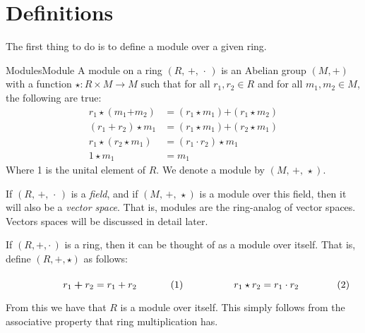 \section{Definitions}
    The first thing to do is to define a module over a given ring.
    \begin{fdefinition}{Modules}{Module}
        A module on a ring $(R,\,+,\,\cdot\,)$ is an
        \gls{Abelian group} $(M,\boldsymbol{+})$ with a function
        $\star:R\times{M}\rightarrow{M}$ such that for all $r_{1},r_{2}\in{R}$
        and for all $m_{1},m_{2}\in{M}$, the following are true:
        \begin{align}
            r_{1}\star(m_{1}\boldsymbol{+}m_{2})
                &=(r_{1}\star{m}_{1})\boldsymbol{+}(r_{1}\star{m}_{2})
                \tag{Scalar Distributivity}\\
            (r_{1}+r_{2})\star{m}_{1}
                &=(r_{1}\star{m}_{1})\boldsymbol{+}(r_{2}\star{m}_{1})
                \tag{Module Distributivity}\\
            r_{1}\star(r_{2}\star{m}_{1})
                &=(r_{1}\cdot{r}_{2})\star{m}_{1}
                \tag{Associativity}\\
            1\star{m}_{1}&=m_{1}
            \tag{Identity}
        \end{align}
        Where 1 is the unital element of $R$. We denote a module by
        $(M,\,\boldsymbol{+},\,\star)$.
    \end{fdefinition}
    If $(R,\,+,\,\cdot\,)$ is a \textit{field}, and if
    $(M,\,\boldsymbol{+},\,\star)$ is a module over this field, then it will
    also be a \textit{vector space}. That is, modules are
    the ring-analog of vector spaces. Vectors spaces will be discussed in
    detail later.
    \begin{example}
        If $(R,+,\cdot\,)$ is a ring, then it can be thought of as a module over
        itself. That is, define $(R,\boldsymbol{+},\star)$ as follows:
        \par
        \begin{subequations}
            \begin{minipage}[b]{0.49\textwidth}
                \begin{equation}
                    r_{1}\boldsymbol{+}r_{2}=r_{1}+r_{2}
                \end{equation}
            \end{minipage}
            \hfill
            \begin{minipage}[b]{0.49\textwidth}
                \begin{equation}
                    r_{1}\star{r}_{2}=r_{1}\cdot{r}_{2}
                \end{equation}
            \end{minipage}
        \end{subequations}
        \par\vspace{2.5ex}
        From this we have that $R$ is a module over itself. This simply follows
        from the associative property that ring multiplication has.
    \end{example}
